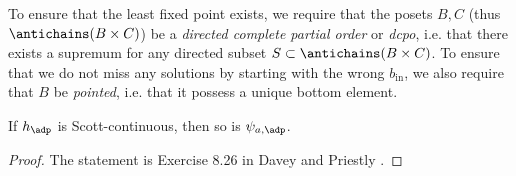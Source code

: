 


To ensure that the least fixed point exists, we require that the posets $B, C$ (thus $\antichains (B \times C)$) be a \emph{directed complete partial order} or \emph{dcpo}, i.e. that there exists a supremum for any directed subset $S \subset \antichains (B \times C)$. To ensure that we do not miss any solutions by starting with the wrong $b_{\text{in}}$, we also require that $B$ be \emph{pointed}, i.e. that it possess a unique bottom element.


\begin{lemma}
If $h_\adp$ is Scott-continuous, then so is $\psi_{a,\adp}$.
\end{lemma}

\begin{proof}
The statement is Exercise 8.26 in Davey and Priestly \citeXXX.
\end{proof}


